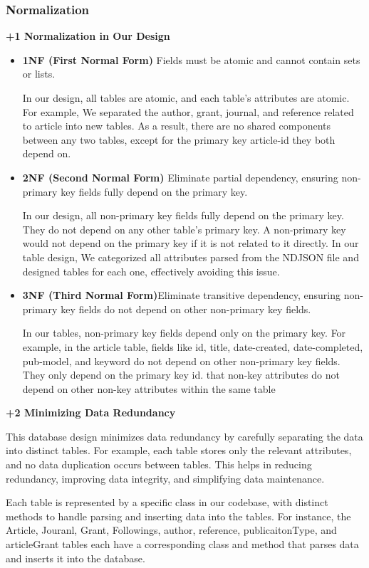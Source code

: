 \documentclass{article}
\begin{document}
\subsubsection{Normalization}

\textbf{\uppercase\expandafter{\romannumeral+1} Normalization in Our Design}
\begin{itemize}
    \item\textbf{ 1NF (First Normal Form)} Fields must be atomic and cannot contain sets or lists. 
    
    In our design, all tables are atomic, and each table’s attributes are atomic. For example, We separated the author, grant, journal, and reference related to article into new tables. As a result, there are no shared components between any two tables, except for the primary key article-id they both depend on.
    \item\textbf{ 2NF (Second Normal Form)} Eliminate partial dependency, ensuring non-primary key fields fully depend on the primary key.
    
    In our design, all non-primary key fields fully depend on the primary key. They do not depend on any other table's primary key. A non-primary key would not depend on the primary key if it is not related to it directly. In our table design, We categorized all attributes parsed from the NDJSON file and designed tables for each one, effectively avoiding this issue.
    \item\textbf{ 3NF (Third Normal Form)}Eliminate transitive dependency, ensuring non-primary key fields do not depend on other non-primary key fields. 
    
    In our tables, non-primary key fields depend only on the primary key. For example, in the article table, fields like id, title, date-created, date-completed, pub-model, and keyword do not depend on other non-primary key fields. They only depend on the primary key id.
 that non-key attributes do not depend on other non-key attributes within
 the same table
\end{itemize}
\textbf{\uppercase\expandafter{\romannumeral+2} Minimizing Data Redundancy}

This database design minimizes data redundancy by carefully separating the data into distinct tables. For example, each table stores only the relevant attributes, and no data duplication occurs between tables. This helps in reducing redundancy, improving data integrity, and simplifying data maintenance.

Each table is represented by a specific class in our codebase, with distinct methods to handle parsing and inserting data into the tables. For instance, the Article, Jouranl, Grant, Followings, author, reference, publicaitonType, and articleGrant tables each have a corresponding class and method that parses data and inserts it into the database.
\end{document}
